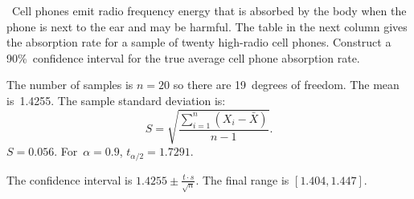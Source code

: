 \begin{problem}
  ~Cell phones emit radio frequency energy that is absorbed by the body when the phone is next to the ear and may be harmful.  The table in the next column gives the absorption rate for a sample of twenty high-radio cell phones.  Construct a 90\%~confidence interval for the true average cell phone absorption rate.
\end{problem}

The number of samples is ${n=20}$ so there are 19~degrees of freedom.  The mean is~1.4255.  The sample standard deviation is:
\begin{equation}\label{eq:SampleStdDev}
  S = \sqrt{\frac{\sum_{i=1}^{n} (X_i - \bar{X})}{n - 1}}\text{.}
\end{equation}
\noindent
${S = 0.056}$. For~${\alpha = 0.9}$, ${t_{\alpha / 2} = 1.7291}$.

The confidence interval is ${1.4255 \pm \frac{t \cdot s}{\sqrt{n}}}$.  The final range is ${[1.404,1.447]}$.
